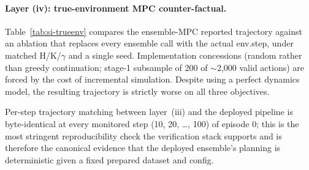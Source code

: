 \documentclass[11pt]{article}
\begin{document}
\paragraph{Layer (iv): true-environment MPC counter-factual.} Table~\ref{tab:si-trueenv} compares the ensemble-MPC reported trajectory against an ablation that replaces every ensemble call with the actual env.step, under matched H/K/$\gamma$ and a single seed. Implementation concessions (random rather than greedy continuation; stage-1 subsample of 200 of $\sim$2{,}000 valid actions) are forced by the cost of incremental simulation. Despite using a perfect dynamics model, the resulting trajectory is strictly worse on all three objectives.

\begin{table}[htbp]
\centering
\small
\caption{True-environment MPC vs.\ deployed ensemble MPC, Bishan, 100 outer steps, seed 0. ``True-env'' replaces every ensemble call with actual env.step; otherwise H=5, K=50, $\gamma$=0.99 unchanged. Implementation concessions stated in caption: random (rather than greedy) continuation, stage-1 subsample of 200 valid actions per step.}
\label{tab:si-trueenv}
\end{table}

Per-step trajectory matching between layer~(iii) and the deployed pipeline is byte-identical at every monitored step (10, 20, \ldots, 100) of episode 0; this is the most stringent reproducibility check the verification stack supports and is therefore the canonical evidence that the deployed ensemble's planning is deterministic given a fixed prepared dataset and config.
\end{document}
